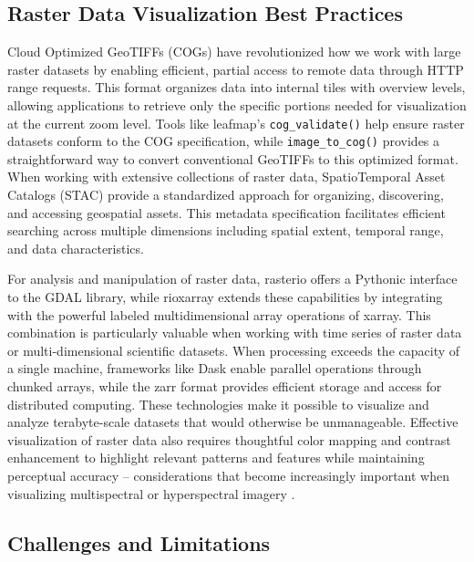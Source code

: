 \subsection{Raster Data Visualization Best Practices}

Cloud Optimized GeoTIFFs (COGs) have revolutionized how we work with large raster datasets by enabling efficient, partial access to remote data through HTTP range requests. This format organizes data into internal tiles with overview levels, allowing applications to retrieve only the specific portions needed for visualization at the current zoom level. Tools like leafmap's \texttt{cog\_validate()} help ensure raster datasets conform to the COG specification, while \texttt{image\_to\_cog()} provides a straightforward way to convert conventional GeoTIFFs to this optimized format. When working with extensive collections of raster data, SpatioTemporal Asset Catalogs (STAC) provide a standardized approach for organizing, discovering, and accessing geospatial assets. This metadata specification facilitates efficient searching across multiple dimensions including spatial extent, temporal range, and data characteristics.

For analysis and manipulation of raster data, rasterio offers a Pythonic interface to the GDAL library, while rioxarray extends these capabilities by integrating with the powerful labeled multidimensional array operations of xarray. This combination is particularly valuable when working with time series of raster data or multi-dimensional scientific datasets. When processing exceeds the capacity of a single machine, frameworks like Dask enable parallel operations through chunked arrays, while the zarr format provides efficient storage and access for distributed computing. These technologies make it possible to visualize and analyze terabyte-scale datasets that would otherwise be unmanageable. Effective visualization of raster data also requires thoughtful color mapping and contrast enhancement to highlight relevant patterns and features while maintaining perceptual accuracy – considerations that become increasingly important when visualizing multispectral or hyperspectral imagery \citep{Liu2024}.

\subsection{Challenges and Limitations}

